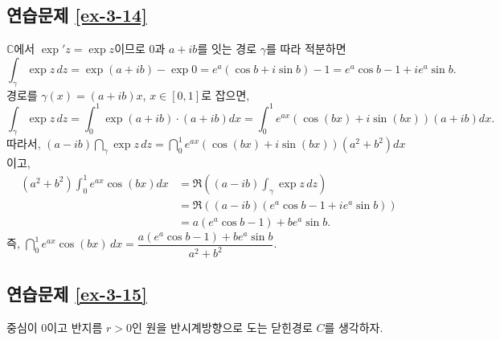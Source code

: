 \subsection*{연습문제 \ref{ex-3-14}}

$\mathbb C$에서  $\exp' z = \exp z$이므로
$0$과 $a+ib$를 잇는 경로 $\gamma$를 따라 적분하면
\[
\int_\gamma \exp z\, dz = \exp(a+ib) - \exp 0 = e^a(\cos b + i \sin b) -1
= e^a\cos b -1 +ie^a\sin b.
\]
 경로를 $\gamma(x) = (a+ib)x$, $x\in[0,1]$로 잡으면,
\[
\int_\gamma \exp z\, dz = \int_0^1 \exp(a+ib)\cdot (a+ib)dx
= \int_0^1 e^{ax}(\cos(bx) + i\sin(bx))(a+ib)dx.
\]
 따라서,
$(a-ib)\dint_\gamma \exp z\, dz = \dint_0^1 e^{ax}(\cos(bx) + i\sin(bx))(a^2+b^2)dx$이고,
\begin{align*}
(a^2+b^2) \int_0^1 e^{ax} \cos (bx)dx
&= \Re\left( (a-ib)\int_\gamma \exp z\, dz \right) \\
&= \Re((a-ib)(e^a\cos b -1 + ie^a\sin b)) \\
&= a(e^a\cos b -1) + be^a \sin b.
\end{align*}
즉,
$\dint_0^1 e^{ax}\cos(bx)\, dx = \dfrac{a(e^a\cos b - 1) + be^a\sin b}{a^2+b^2}$.

\subsection*{연습문제 \ref{ex-3-15}}

중심이 $0$이고 반지름 $r>0$인 원을 반시계방향으로 도는 닫힌경로 $C$를 생각하자.






%



